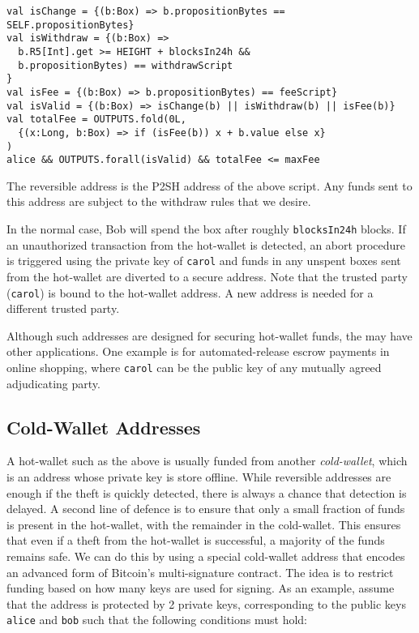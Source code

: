 \documentclass[runningheads]{llncs}
\begin{document}
\small{
\begin{verbatim}
val isChange = {(b:Box) => b.propositionBytes == SELF.propositionBytes}
val isWithdraw = {(b:Box) => 
  b.R5[Int].get >= HEIGHT + blocksIn24h && 
  b.propositionBytes) == withdrawScript
}
val isFee = {(b:Box) => b.propositionBytes) == feeScript}
val isValid = {(b:Box) => isChange(b) || isWithdraw(b) || isFee(b)}
val totalFee = OUTPUTS.fold(0L, 
  {(x:Long, b:Box) => if (isFee(b)) x + b.value else x}
)
alice && OUTPUTS.forall(isValid) && totalFee <= maxFee
\end{verbatim}
}

The reversible address is the P2SH address of the above script. Any funds sent to this address are subject to the withdraw rules that we desire.

In the normal case, Bob will spend the box after roughly \texttt{blocksIn24h} blocks. If an unauthorized transaction from the hot-wallet is detected, an abort procedure is triggered using the private key of \texttt{carol} and funds in any unspent boxes sent from the hot-wallet are diverted to a secure address. %
Note that the trusted party (\texttt{carol}) is bound to the hot-wallet address. A new address is needed for a different trusted party. 

Although such addresses are designed for securing hot-wallet funds, the may have other applications. One example is for automated-release escrow payments in online shopping, where \texttt{carol} can be the public key of any mutually agreed adjudicating party. 


\subsection{Cold-Wallet Addresses}

\label{cold-wallet}

A hot-wallet such as the above is usually funded from another {\em cold-wallet}, which is an address whose private key is store offline. While reversible addresses are enough if the theft is quickly detected, there is always a chance that detection is delayed. A second line of defence is to ensure that only a small fraction of funds is present in the hot-wallet, with the remainder in the cold-wallet. This ensures that even if a theft from the hot-wallet is successful, a majority of the funds remains safe. We can do this by using a special cold-wallet address that encodes an advanced form of Bitcoin's multi-signature contract. 
The idea is to restrict funding based on how many keys are used for signing. As an example, assume that the address is protected by 2 private keys, corresponding to the public keys \texttt{alice} and \texttt{bob} such that the following conditions must hold:
\end{document}
